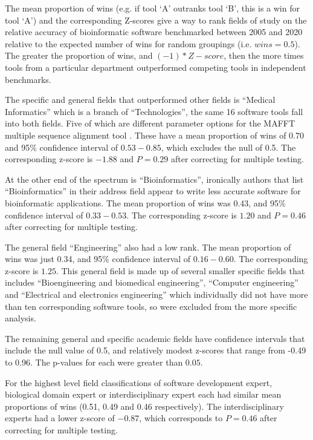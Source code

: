 \documentclass[fleqn,10pt,doc,onecolumn]{SelfArx}%
\begin{document}
The mean proportion of wins (e.g. if tool `A' outranks tool `B', this
is a win for tool `A') and the corresponding Z-scores give a way to
rank fields of study on the relative accuracy of bioinformatic
software benchmarked between 2005 and 2020 relative to the expected
number of wins for random groupings (i.e. $wins=0.5$). The greater the
proportion of wins, and $(-1)*Z-score$, then the more times tools from
a particular department outperformed competing tools in independent
benchmarks.

The specific and general fields that outperformed other
fields is ``Medical Informatics'' which is a branch of
``Technologies'', the same 16 software tools fall into both
fields. Five of which are different parameter options for the MAFFT
multiple sequence alignment tool \cite{katoh2008recent}.  These have a
mean proportion of wins of 0.70 and 95\% confidence interval of
$0.53-0.85$, which excludes the null of 0.5. The corresponding z-score
is $-1.88$ and $P=0.29$ after correcting for multiple testing.

At the other end of the spectrum is ``Bioinformatics'', ironically
authors that list ``Bioinformatics'' in their address field appear to
write less accurate software for bioinformatic
applications. The mean proportion of wins was 0.43, and 95\%
confidence interval of $0.33-0.53$. The corresponding z-score is
$1.20$ and $P=0.46$ after correcting for multiple
testing.

The general field ``Engineering'' also had a low rank. The mean
proportion of wins was just 0.34, and 95\% confidence interval of
$0.16-0.60$. The corresponding z-score is $1.25$. This general field
is made up of several smaller specific fields that includes
``Bioengineering and biomedical engineering'', ``Computer
engineering'' and ``Electrical and electronics engineering'' which
individually did not have more than ten corresponding software tools,
so were excluded from the more specific analysis.

The remaining general and specific academic fields have confidence
intervals that include the null value of 0.5, and relatively modest
z-scores that range from -0.49 to 0.96. The p-values for each were
greater than $0.05$. 

For the highest level field classifications of software development
expert, biological domain expert or interdisciplinary expert each had
similar mean proportions of wins (0.51, 0.49 and 0.46
respectively). The interdisciplinary experts had a lower z-score of
$-0.87$, which corresponds to $P=0.46$ after correcting for multiple
testing.
\end{document}

